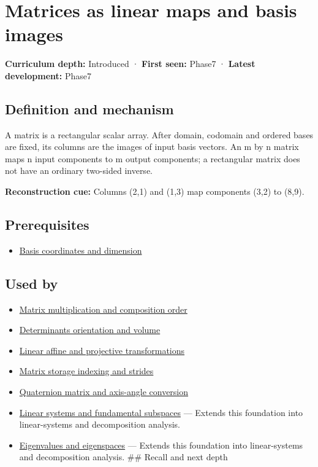\hypertarget{appendix-bd39c3bf5d64}{}\label{referencestart:appendix-bd39c3bf5d64}
\section{Matrices as linear maps and basis images}\label{appendix-bd39c3bf5d64-matrices-as-linear-maps-and-basis-images}

\textbf{Curriculum depth:} Introduced · \textbf{First seen:} Phase7 · \textbf{Latest development:} Phase7

\subsection{Definition and mechanism}\label{appendix-bd39c3bf5d64-definition-and-mechanism}

A matrix is a rectangular scalar array. After domain, codomain and ordered bases are fixed, its columns are the images of input basis vectors. An m by n matrix maps n input components to m output components; a rectangular matrix does not have an ordinary two-sided inverse.

\textbf{Reconstruction cue:} Columns (2,1) and (1,3) map components (3,2) to (8,9).

\subsection{Prerequisites}\label{appendix-bd39c3bf5d64-prerequisites}

\begin{itemize}
\tightlist
\item
  \hyperref[appendix-ce0341f7ea0d]{Basis coordinates and dimension}
\end{itemize}

\subsection{Used by}\label{appendix-bd39c3bf5d64-used-by}

\begin{itemize}
\tightlist
\item
  \hyperref[appendix-ab31ef447dbf]{Matrix multiplication and composition order}
\item
  \hyperref[appendix-da478be01d02]{Determinants orientation and volume}
\item
  \hyperref[appendix-0bf0ca73f735]{Linear affine and projective transformations}
\item
  \hyperref[appendix-ffdc1d4e5350]{Matrix storage indexing and strides}
\item
  \hyperref[appendix-26d8da71f6c4]{Quaternion matrix and axis-angle conversion}
\item
  \hyperref[appendix-8572a4a060c1]{Linear systems and fundamental subspaces} --- Extends this foundation into linear-systems and decomposition analysis.
\item
  \hyperref[appendix-0b3be18411f9]{Eigenvalues and eigenspaces} --- Extends this foundation into linear-systems and decomposition analysis. \#\# Recall and next depth
\end{itemize}

